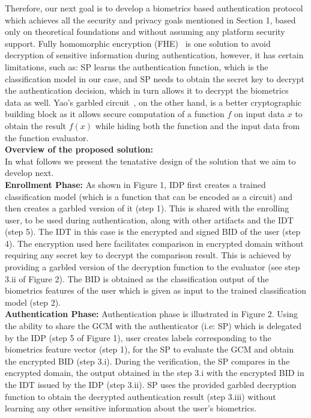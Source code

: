 \documentclass[10pt]{article}
\begin{document}
Therefore, our next goal is to develop a biometrics based authentication protocol which achieves all the security and 
privacy goals mentioned in Section 1, based only on theoretical foundations and without assuming any platform security support. Fully homomorphic 
encryption (FHE)~\cite{fhe} is one solution to avoid decryption of sensitive information during authentication, however, it has certain 
limitations, such as: SP learns the authentication function, which is the classification model 
in our case, and SP needs to obtain the secret key to decrypt the authentication decision, which in turn allows it to decrypt the biometrics data 
as well. 
Yao's garbled circuit~\cite{yaogc}, on the other hand, is a better cryptographic 
building block as it allows secure computation of a function $f$ on input data $x$ to obtain the result $f(x)$ while hiding both the function and the 
input data from the function evaluator.\\

\textbf{Overview of the proposed solution:}\\
In what follows we present the tenatative design of the solution that we aim to develop next.\\

\textbf{Enrollment Phase:}
As shown in Figure 1, IDP first creates a trained classification model (which is a function that can be encoded as a circuit) and then creates a 
garbled version of it (step 1). This is shared with the enrolling user, to be used during authentication, along with other artifacts and the IDT 
(step 5). The IDT in this case is the encrypted and signed BID of the user (step 4). The encryption used here facilitates comparison in 
encrypted domain without requiring any secret key to decrypt the comparison result. This is achieved by providing a garbled version of the 
decryption function to the evaluator (see step 3.ii of Figure 2). The BID is obtained as the classification output of the biometrics features of the 
user which is given as input to the trained classification model (step 2).\\

\textbf{Authentication Phase:}
Authentication phase is illustrated in Figure 2. Using the ability to share the GCM with the authenticator (i.e: SP) which is delegated by the IDP 
(step 5 of Figure 1), user creates labels corresponding to the biometrics feature vector (step 1), for the SP to evaluate the GCM and obtain the 
encrypted BID (step 3.i).
During the verification, the SP compares in the encrypted domain, the output obtained in the step 3.i with the encrypted BID in the IDT issued by the 
IDP (step 3.ii). SP uses the provided garbled decryption function to obtain the decrypted authentication result (step 3.iii) without learning any 
other sensitive information about the user's biometrics.\\
\end{document}
